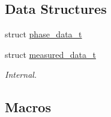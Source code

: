 \subsection*{Data Structures}
\begin{DoxyCompactItemize}
\item 
struct \hyperlink{a00030}{phase\-\_\-data\-\_\-t}
\item 
struct \hyperlink{a00029}{measured\-\_\-data\-\_\-t}
\begin{DoxyCompactList}\small\item\em Internal. \end{DoxyCompactList}\end{DoxyCompactItemize}
\subsection*{Macros}
